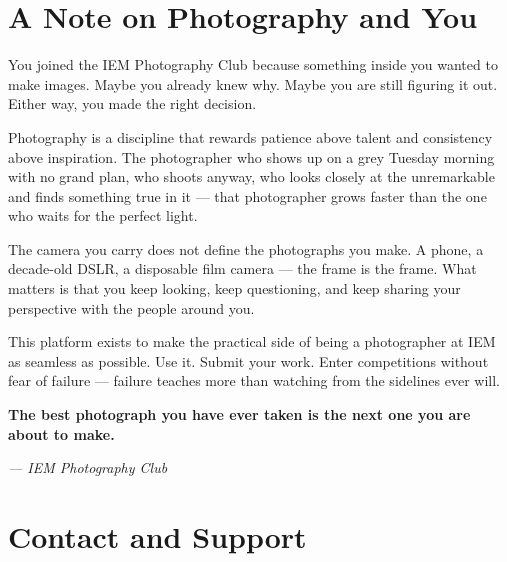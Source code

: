 \documentclass[12pt,a4paper]{article}
\begin{document}
\section{A Note on Photography and You}

\begin{mdframed}[linecolor=ClubRed,linewidth=1.5pt,leftmargin=0pt,rightmargin=0pt,
  innerleftmargin=14pt,innerrightmargin=14pt,innertopmargin=14pt,innerbottommargin=14pt,
  backgroundcolor=BoxBg]

You joined the IEM Photography Club because something inside you wanted to make images. Maybe you already knew why. Maybe you are still figuring it out. Either way, you made the right decision.

\medskip
Photography is a discipline that rewards patience above talent and consistency above inspiration. The photographer who shows up on a grey Tuesday morning with no grand plan, who shoots anyway, who looks closely at the unremarkable and finds something true in it --- that photographer grows faster than the one who waits for the perfect light.

\medskip
The camera you carry does not define the photographs you make. A phone, a decade-old DSLR, a disposable film camera --- the frame is the frame. What matters is that you keep looking, keep questioning, and keep sharing your perspective with the people around you.

\medskip
This platform exists to make the practical side of being a photographer at IEM as seamless as possible. Use it. Submit your work. Enter competitions without fear of failure --- failure teaches more than watching from the sidelines ever will.

\medskip
\textbf{The best photograph you have ever taken is the next one you are about to make.}

\medskip
\textit{--- IEM Photography Club}

\end{mdframed}

\section*{Contact and Support}
\end{document}
